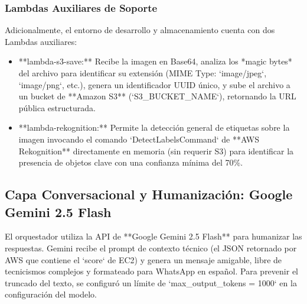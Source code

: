 \subsubsection{Lambdas Auxiliares de Soporte}
Adicionalmente, el entorno de desarrollo y almacenamiento cuenta con dos Lambdas auxiliares:
\begin{itemize}
    \item **lambda-s3-save:** Recibe la imagen en Base64, analiza los *magic bytes* del archivo para identificar su extensión (MIME Type: `image/jpeg`, `image/png`, etc.), genera un identificador UUID único, y sube el archivo a un bucket de **Amazon S3** (`S3\_BUCKET\_NAME`), retornando la URL pública estructurada.
    \item **lambda-rekognition:** Permite la detección general de etiquetas sobre la imagen invocando el comando `DetectLabelsCommand` de **AWS Rekognition** directamente en memoria (sin requerir S3) para identificar la presencia de objetos clave con una confianza mínima del 70\%.
\end{itemize}

\subsection{Capa Conversacional y Humanización: Google Gemini 2.5 Flash}
El orquestador utiliza la API de **Google Gemini 2.5 Flash** para humanizar las respuestas. Gemini recibe el prompt de contexto técnico (el JSON retornado por AWS que contiene el `score` de EC2) y genera un mensaje amigable, libre de tecnicismos complejos y formateado para WhatsApp en español. Para prevenir el truncado del texto, se configuró un límite de `max\_output\_tokens = 1000` en la configuración del modelo.
